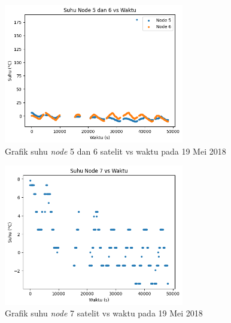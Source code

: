 \begin{figure}[H]
\setlength{}
\begin{center}
\includegraphics[width=0.7\textwidth]{fig/raw_node56_temp_2018-05-19.png}
	\caption{Grafik suhu \textit{node} 5 dan 6 satelit vs waktu pada 19 Mei 2018}
\label{fig:rawtemp5619}
\end{center}
\end{figure}

\begin{figure}[H]
\setlength{}
\begin{center}
\includegraphics[width=0.7\textwidth]{fig/raw_node7_temp_2018-05-19.png}
	\caption{Grafik suhu \textit{node} 7 satelit vs waktu pada 19 Mei 2018}
\label{fig:rawtemp719}
\end{center}
\end{figure}

